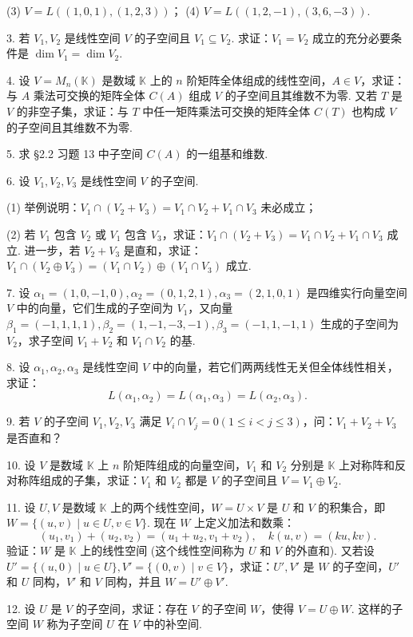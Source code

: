 \documentclass[UTF8, 12pt, fontset=fandol, oneside]{ctexart}
\begin{document}
(3) $V=L((1,0,1),(1,2,3))$；\qquad
(4) $V=L((1,2,-1),(3,6,-3))$.

3. 若 $V_1,V_2$ 是线性空间 $V$ 的子空间且 $V_1\subseteq V_2$. 求证：$V_1=V_2$ 成立的充分必要条件是 $\dim V_1=\dim V_2$.

4. 设 $V=M_n(\mathbb{K})$ 是数域 $\mathbb{K}$ 上的 $n$ 阶矩阵全体组成的线性空间，$A\in V$，求证：与 $A$ 乘法可交换的矩阵全体 $C(A)$ 组成 $V$ 的子空间且其维数不为零. 又若 $T$ 是 $V$ 的非空子集，求证：与 $T$ 中任一矩阵乘法可交换的矩阵全体 $C(T)$ 也构成 $V$ 的子空间且其维数不为零.

5. 求 §2.2 习题 13 中子空间 $C(A)$ 的一组基和维数.

6. 设 $V_1,V_2,V_3$ 是线性空间 $V$ 的子空间.

(1) 举例说明：$V_1\cap(V_2+V_3)=V_1\cap V_2+V_1\cap V_3$ 未必成立；

(2) 若 $V_1$ 包含 $V_2$ 或 $V_1$ 包含 $V_3$，求证：$V_1\cap(V_2+V_3)=V_1\cap V_2+V_1\cap V_3$ 成立. 进一步，若 $V_2+V_3$ 是直和，求证：$V_1\cap(V_2\oplus V_3)=(V_1\cap V_2)\oplus(V_1\cap V_3)$ 成立.

7. 设 $\alpha_1=(1,0,-1,0),\alpha_2=(0,1,2,1),\alpha_3=(2,1,0,1)$ 是四维实行向量空间 $V$ 中的向量，它们生成的子空间为 $V_1$，又向量 $\beta_1=(-1,1,1,1),\beta_2=(1,-1,-3,-1),\beta_3=(-1,1,-1,1)$ 生成的子空间为 $V_2$，求子空间 $V_1+V_2$ 和 $V_1\cap V_2$ 的基.

8. 设 $\alpha_1,\alpha_2,\alpha_3$ 是线性空间 $V$ 中的向量，若它们两两线性无关但全体线性相关，求证：
\[
L(\alpha_1,\alpha_2)=L(\alpha_1,\alpha_3)=L(\alpha_2,\alpha_3).
\]

9. 若 $V$ 的子空间 $V_1,V_2,V_3$ 满足 $V_i\cap V_j=0(1\leq i<j\leq 3)$，问：$V_1+V_2+V_3$ 是否直和？

10. 设 $V$ 是数域 $\mathbb{K}$ 上 $n$ 阶矩阵组成的向量空间，$V_1$ 和 $V_2$ 分别是 $\mathbb{K}$ 上对称阵和反对称阵组成的子集，求证：$V_1$ 和 $V_2$ 都是 $V$ 的子空间且 $V=V_1\oplus V_2$.

11. 设 $U,V$ 是数域 $\mathbb{K}$ 上的两个线性空间，$W=U\times V$ 是 $U$ 和 $V$ 的积集合，即 $W=\{(u,v)\mid u\in U,v\in V\}$. 现在 $W$ 上定义加法和数乘：
\[
(u_1,v_1)+(u_2,v_2)=(u_1+u_2,v_1+v_2),\quad k(u,v)=(ku,kv).
\]
验证：$W$ 是 $\mathbb{K}$ 上的线性空间 (这个线性空间称为 $U$ 和 $V$ 的外直和). 又若设 $U'=\{(u,0)\mid u\in U\},V'=\{(0,v)\mid v\in V\}$，求证：$U',V'$ 是 $W$ 的子空间，$U'$ 和 $U$ 同构，$V'$ 和 $V$ 同构，并且 $W=U'\oplus V'$.

12. 设 $U$ 是 $V$ 的子空间，求证：存在 $V$ 的子空间 $W$，使得 $V=U\oplus W$. 这样的子空间 $W$ 称为子空间 $U$ 在 $V$ 中的补空间.
\end{document}
